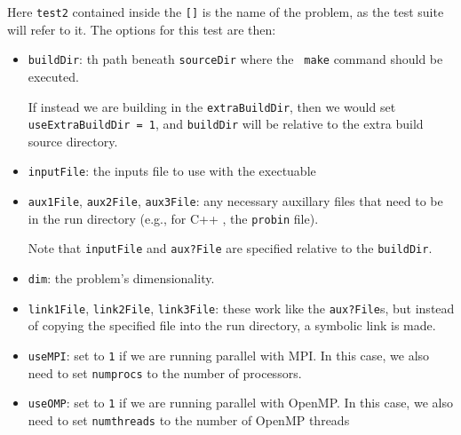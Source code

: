Here {\tt test2} contained inside the {\tt []} is the name of the
problem, as the test suite will refer to it.  The options
for this test are then:
\begin{itemize}
\item {\tt buildDir}: th path beneath {\tt sourceDir} where the {\tt
  make} command should be executed.

  If instead we are building in the {\tt extraBuildDir}, then we would
  set {\tt useExtraBuildDir = 1}, and {\tt buildDir} will be relative
  to the extra build source directory.

\item {\tt inputFile}: the inputs file to use with the exectuable

\item {\tt aux1File}, {\tt aux2File}, {\tt aux3File}: any necessary
  auxillary files that need to be in the run directory (e.g., for C++
  \boxlib, the {\tt probin} file).

  Note that {\tt inputFile} and {\tt aux?File} are specified relative
  to the {\tt buildDir}.

\item {\tt dim}: the problem's dimensionality.

\item {\tt link1File}, {\tt link2File}, {\tt link3File}: these work
  like the {\tt aux?File}s, but instead of copying the specified file
  into the run directory, a symbolic link is made.

\item {\tt useMPI}: set to {\tt 1} if we are running parallel with
  MPI.  In this case, we also need to set {\tt numprocs} to the number
  of processors.

\item {\tt useOMP}: set to {\tt 1} if we are running parallel with
  OpenMP.  In this case, we also need to set {\tt numthreads} to the
  number of OpenMP threads
\end{itemize}

